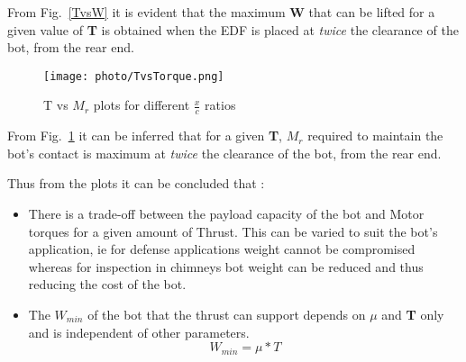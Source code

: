 From Fig.~\ref{TvsW} it is evident that the maximum \textbf{W} that can be lifted for a given value of \textbf{T} is obtained when the EDF is placed at \textit{twice} the clearance of the bot, from the rear end.

\begin{figure}[h]
  \begin{center}
  \texttt{[image: photo/TvsTorque.png]}\\
  \caption{T vs $M_r$ plots for different $\frac{x}{c}$ ratios}\label{TvsTorque}
  \end{center}
\end{figure}

From Fig.~\ref{TvsTorque} it can be inferred that for a given \textbf{T}, \textbf{$M_r$} required to maintain the bot's contact is maximum at \textit{twice} the clearance of the bot, from the rear end.

Thus from the plots it can be concluded that :
\begin{itemize}
    \item There is a trade-off between the payload capacity of the bot and Motor torques for a given amount of Thrust. This can be varied to suit the bot's application, ie for defense applications weight cannot be compromised whereas for inspection in chimneys bot weight can be reduced and thus reducing the cost of the bot.
    \item The $W_{min}$ of the bot that the thrust can support depends on $\mu$ and \textbf{T} only and is independent of other parameters.
    \begin{equation}
        W_{min} = \mu * T
    \end{equation}
\end{itemize} 
